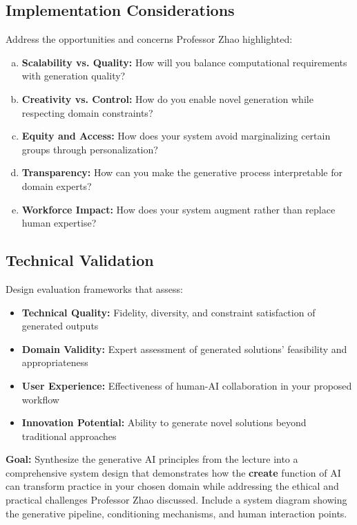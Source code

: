 \documentclass[11pt]{article}
\begin{document}
\subsection*{Implementation Considerations}
Address the opportunities and concerns Professor Zhao highlighted:

\begin{enumerate}[(a)]
\item \textbf{Scalability vs. Quality:} How will you balance computational requirements with generation quality?
\item \textbf{Creativity vs. Control:} How do you enable novel generation while respecting domain constraints?
\item \textbf{Equity and Access:} How does your system avoid marginalizing certain groups through personalization?
\item \textbf{Transparency:} How can you make the generative process interpretable for domain experts?
\item \textbf{Workforce Impact:} How does your system augment rather than replace human expertise?
\end{enumerate}

\subsection*{Technical Validation}
Design evaluation frameworks that assess:
\begin{itemize}
\item \textbf{Technical Quality:} Fidelity, diversity, and constraint satisfaction of generated outputs
\item \textbf{Domain Validity:} Expert assessment of generated solutions' feasibility and appropriateness
\item \textbf{User Experience:} Effectiveness of human-AI collaboration in your proposed workflow
\item \textbf{Innovation Potential:} Ability to generate novel solutions beyond traditional approaches
\end{itemize}

\noindent\textbf{Goal:} Synthesize the generative AI principles from the lecture into a comprehensive system design that demonstrates how the \textbf{create} function of AI can transform practice in your chosen domain while addressing the ethical and practical challenges Professor Zhao discussed. Include a system diagram showing the generative pipeline, conditioning mechanisms, and human interaction points.
\end{document}
